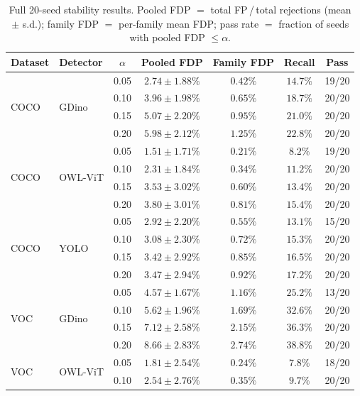 \documentclass{article}
\theoremstyle{remark}
\newcommand{\1}{\mathbf{1}}
\begin{document}
\begin{table}[h]
\centering
\small
\caption{Full 20-seed stability results. Pooled FDP $=$ total FP\,/\,total
rejections (mean $\pm$ s.d.); family FDP $=$ per-family mean FDP;
pass rate $=$ fraction of seeds with pooled FDP $\le\alpha$.}
\label{tab:20seed_full}
\begin{tabular*}{\linewidth}{@{\extracolsep{\fill}}llccccc@{}}
\toprule
Dataset & Detector & $\alpha$ & Pooled FDP & Family FDP & Recall & Pass \\
\midrule
\multirow{4}{*}{COCO} & \multirow{4}{*}{GDino}
 & 0.05 & $2.74 \pm 1.88\%$ & $0.42\%$ & $14.7\%$ & 19/20 \\
 & & 0.10 & $3.96 \pm 1.98\%$ & $0.65\%$ & $18.7\%$ & 20/20 \\
 & & 0.15 & $5.07 \pm 2.20\%$ & $0.95\%$ & $21.0\%$ & 20/20 \\
 & & 0.20 & $5.98 \pm 2.12\%$ & $1.25\%$ & $22.8\%$ & 20/20 \\
\midrule
\multirow{4}{*}{COCO} & \multirow{4}{*}{OWL-ViT}
 & 0.05 & $1.51 \pm 1.71\%$ & $0.21\%$ & $8.2\%$ & 19/20 \\
 & & 0.10 & $2.31 \pm 1.84\%$ & $0.34\%$ & $11.2\%$ & 20/20 \\
 & & 0.15 & $3.53 \pm 3.02\%$ & $0.60\%$ & $13.4\%$ & 20/20 \\
 & & 0.20 & $3.80 \pm 3.01\%$ & $0.81\%$ & $15.4\%$ & 20/20 \\
\midrule
\multirow{4}{*}{COCO} & \multirow{4}{*}{YOLO}
 & 0.05 & $2.92 \pm 2.20\%$ & $0.55\%$ & $13.1\%$ & 15/20 \\
 & & 0.10 & $3.08 \pm 2.30\%$ & $0.72\%$ & $15.3\%$ & 20/20 \\
 & & 0.15 & $3.42 \pm 2.92\%$ & $0.85\%$ & $16.5\%$ & 20/20 \\
 & & 0.20 & $3.47 \pm 2.94\%$ & $0.92\%$ & $17.2\%$ & 20/20 \\
\midrule
\multirow{4}{*}{VOC} & \multirow{4}{*}{GDino}
 & 0.05 & $4.57 \pm 1.67\%$ & $1.16\%$ & $25.2\%$ & 13/20 \\
 & & 0.10 & $5.62 \pm 1.96\%$ & $1.69\%$ & $32.6\%$ & 20/20 \\
 & & 0.15 & $7.12 \pm 2.58\%$ & $2.15\%$ & $36.3\%$ & 20/20 \\
 & & 0.20 & $8.66 \pm 2.83\%$ & $2.74\%$ & $38.8\%$ & 20/20 \\
\midrule
\multirow{4}{*}{VOC} & \multirow{4}{*}{OWL-ViT}
 & 0.05 & $1.81 \pm 2.54\%$ & $0.24\%$ & $7.8\%$ & 18/20 \\
 & & 0.10 & $2.54 \pm 2.76\%$ & $0.35\%$ & $9.7\%$ & 20/20 \\

\end{tabular*}
\end{table}
\end{document}
